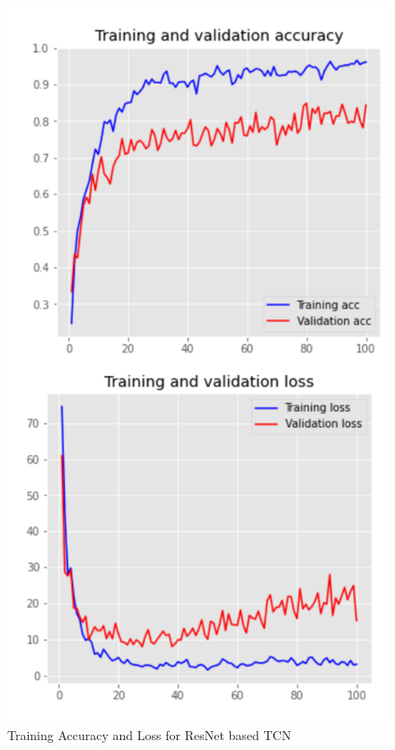 \documentclass[conference]{IEEEtran}
\begin{document}
\begin{figure}
    \centering
    \includegraphics[scale = 1.2]{accuracy.png}
    
    \caption{ Training Accuracy and Loss for ResNet based TCN}
\end{figure}
\end{document}
